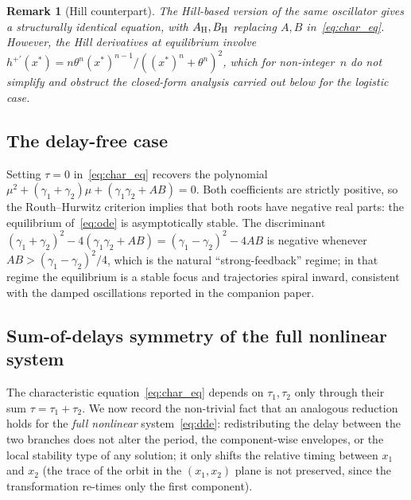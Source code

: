 \documentclass[sn-mathphys,Numbered]{sn-jnl}
\theoremstyle{thmstyleone}
\theoremstyle{thmstyletwo}
\theoremstyle{thmstylethree}
\newtheorem{remark}{Remark}
\begin{document}
\begin{remark}[Hill counterpart]
The Hill-based version of the same oscillator gives a structurally
identical equation, with $A_{\rm H},B_{\rm H}$ replacing
$A,B$ in~\eqref{eq:char_eq}. However, the Hill derivatives at equilibrium
involve $h^{+\prime}(x^*)=n\theta^n (x^*)^{n-1}/((x^*)^n+\theta^n)^2$,
which for non-integer~$n$ do not simplify and obstruct the closed-form
analysis carried out below for the logistic case.
\end{remark}

\subsection{The delay-free case}

Setting $\tau=0$ in~\eqref{eq:char_eq} recovers the polynomial
$\mu^2 + (\gamma_1+\gamma_2)\mu + (\gamma_1\gamma_2+AB) = 0$. Both
coefficients are strictly positive, so the Routh--Hurwitz criterion
implies that both roots have negative real parts: the equilibrium
of~\eqref{eq:ode} is asymptotically stable. The discriminant
$(\gamma_1+\gamma_2)^2-4(\gamma_1\gamma_2+AB) = (\gamma_1-\gamma_2)^2-4AB$
is negative whenever $AB>(\gamma_1-\gamma_2)^2/4$, which is the natural
``strong-feedback'' regime; in that regime the equilibrium is a stable
focus and trajectories spiral inward, consistent with the damped
oscillations reported in the companion paper.

\subsection{Sum-of-delays symmetry of the full nonlinear system}
\label{sec:sum_symmetry}

The characteristic equation~\eqref{eq:char_eq} depends on $\tau_1,\tau_2$
only through their sum $\tau=\tau_1+\tau_2$. We now record the
non-trivial fact that an analogous reduction holds for the
\emph{full nonlinear} system~\eqref{eq:dde}: redistributing the delay
between the two branches does not alter the period, the component-wise
envelopes, or the local stability type of any solution; it only shifts
the relative timing between $x_1$ and $x_2$ (the trace of the orbit in
the $(x_1,x_2)$ plane is not preserved, since the transformation
re-times only the first component).
\end{document}
